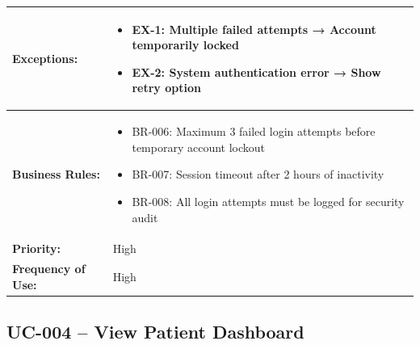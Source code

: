 \documentclass[12pt,a4paper]{article}
\begin{document}
\begin{longtable}{|p{4.5cm}|p{10.5cm}|}
\textbf{Exceptions:} &
\begin{itemize}
  \item EX-1: Multiple failed attempts → Account temporarily locked
  \item EX-2: System authentication error → Show retry option
\end{itemize} \\
\hline
\textbf{Business Rules:} &
\begin{itemize}
  \item BR-006: Maximum 3 failed login attempts before temporary account lockout
  \item BR-007: Session timeout after 2 hours of inactivity
  \item BR-008: All login attempts must be logged for security audit
\end{itemize} \\
\hline
\textbf{Priority:} & High \\
\hline
\textbf{Frequency of Use:} & High \\
\hline
\end{longtable}

\subsection{UC-004 – View Patient Dashboard}
\end{document}
